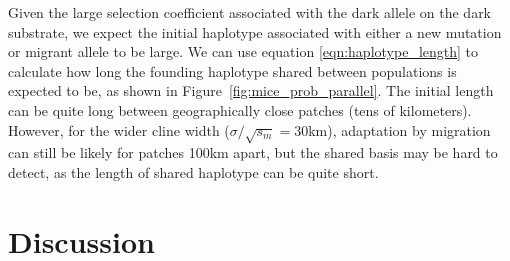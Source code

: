 \documentclass{article}
\newcommand{\gc}[1]{{\it\color{green}(#1)} }
\begin{document}
Given the large selection coefficient associated with the dark allele
on the dark substrate, we expect the initial haplotype associated with
either a new mutation or migrant allele to be large. 
We can use equation \eqref{eqn:haplotype_length} to calculate how long the founding
haplotype shared between populations is expected to be,
as shown in Figure~\ref{fig:mice_prob_parallel}. 
The initial length can be quite long between geographically close patches (tens of kilometers). 
However, for the wider cline width ($\sigma/\sqrt{s_m} = 30$km), 
adaptation by migration can still be likely for patches 100km apart, 
but the shared basis may be hard to detect, as the length of shared haplotype can be quite short. 



\section*{Discussion} 
\label{ss:discussion}
\end{document}

